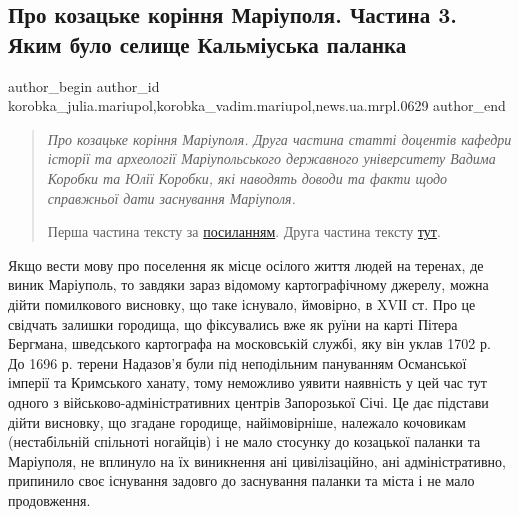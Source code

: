  
 
 
 
 
 
\subsection{Про козацьке коріння Маріуполя. Частина 3. Яким було селище Кальміуська паланка}
\label{sec:05_09_2023.stz.news.ua.mrpl.0629.1.pro_kozacke_korinnja_mariupolja_3}
 
\ifcmt
 author_begin
   author_id korobka_julia.mariupol,korobka_vadim.mariupol,news.ua.mrpl.0629
 author_end
\fi

\begin{quote}
\em
Про козацьке коріння Маріуполя. Друга частина статті доцентів кафедри історії
та археології Маріупольського державного університету Вадима Коробки та Юлії
Коробки, які наводять доводи та факти щодо справжньої дати заснування
Маріуполя. 

Перша частина тексту за \href{https://www.0629.com.ua/news/3653256/pro-kozacke-korinna-mariupola-castina-1-davni-sprobi-osagnuti-cinnik-ukrainskogo-kozactva-v-istorii-mariupola}{посиланням}. Друга частина тексту \href{https://www.0629.com.ua/news/3654781/pro-kozacke-korinna-mariupola-castina-2-novi-sprobi-privernuti-uvagu-do-dati-zasnuvanna-mariupola-ta-dii-komandi-bojcenka-na-comu-napramku}{тут}.
\end{quote}

Якщо вести мову про поселення як місце осілого життя людей на теренах, де виник
Маріуполь, то завдяки зараз відомому картографічному джерелу, можна дійти
помилкового висновку, що таке існувало, ймовірно, в XVІІ ст. Про це свідчать
залишки городища, що фіксувались вже як руїни на карті Пітера Бергмана,
шведського картографа на московській службі, яку він уклав 1702 р.  До 1696 р.
терени Надазов'я були під неподільним пануванням Османської імперії та
Кримського ханату, тому неможливо уявити наявність у цей час тут одного з
військово-адміністративних центрів Запорозької Січі. Це дає підстави дійти
висновку, що згадане  городище, найімовірніше, належало кочовикам (нестабільній
спільноті ногайців) і не мало стосунку до козацької паланки та Маріуполя, не
вплинуло на їх виникнення ані цивілізаційно, ані адміністративно, припинило
своє існування задовго до заснування паланки та міста і не мало продовження. 

